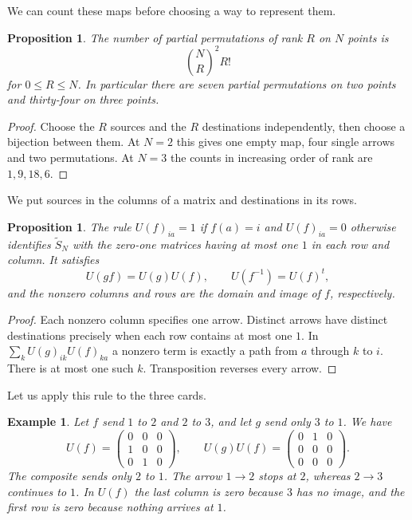 \documentclass[11pt,a4paper]{article}
\newtheorem{prop}[thm]{Proposition}
\newtheorem{ex}[thm]{Example}
\begin{document}
We can count these maps before choosing a way to represent them.

\begin{prop}
The number of partial permutations of rank $R$ on $N$ points is
\[
 \binom{N}{R}^2 R!
\]
for $0\leq R\leq N$. In particular there are seven partial permutations on two points and thirty-four on three points.
\end{prop}
\begin{proof}
Choose the $R$ sources and the $R$ destinations independently, then choose a bijection between them. At $N=2$ this gives one empty map, four single arrows and two permutations. At $N=3$ the counts in increasing order of rank are $1,9,18,6$.
\end{proof}

We put sources in the columns of a matrix and destinations in its rows.

\begin{prop}\label{permmat}
The rule $U(f)_{ia}=1$ if $f(a)=i$ and $U(f)_{ia}=0$ otherwise identifies $\widetilde S_N$ with the zero-one matrices having at most one $1$ in each row and column. It satisfies
\[
 U(gf)=U(g)U(f),\qquad U(f^{-1})=U(f)^t ,
\]
and the nonzero columns and rows are the domain and image of $f$, respectively.
\end{prop}
\begin{proof}
Each nonzero column specifies one arrow. Distinct arrows have distinct destinations precisely when each row contains at most one $1$. In $\sum_k U(g)_{ik}U(f)_{ka}$ a nonzero term is exactly a path from $a$ through $k$ to $i$. There is at most one such $k$. Transposition reverses every arrow.
\end{proof}

Let us apply this rule to the three cards.

\begin{ex}
Let $f$ send $1$ to $2$ and $2$ to $3$, and let $g$ send only $3$ to $1$. We have
\[
 U(f)=\begin{pmatrix}0&0&0\\1&0&0\\0&1&0\end{pmatrix},
 \qquad U(g)U(f)=\begin{pmatrix}0&1&0\\0&0&0\\0&0&0\end{pmatrix}.
\]
The composite sends only $2$ to $1$. The arrow $1\to2$ stops at $2$, whereas $2\to3$ continues to $1$. In $U(f)$ the last column is zero because $3$ has no image, and the first row is zero because nothing arrives at $1$.
\end{ex}
\end{document}
